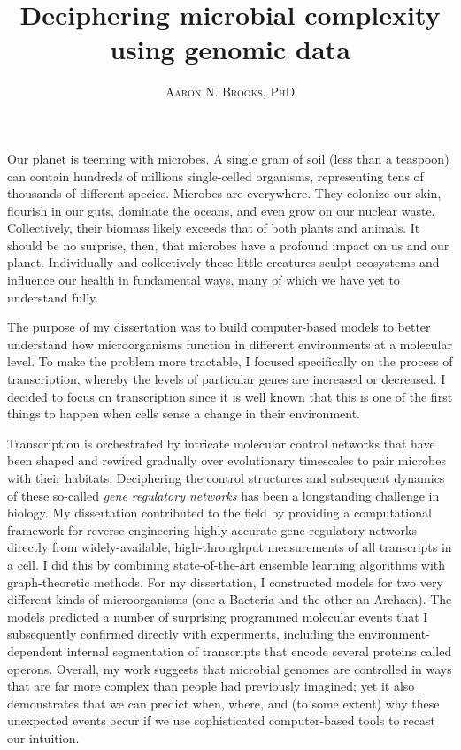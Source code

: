 \documentclass[paper=letter, fontsize=12pt]{article}
\title{\vspace{-15mm}\fontsize{20pt}{10pt}\selectfont\textbf{Deciphering microbial complexity using genomic data}} %
\author{
\large
{\textsc{ Aaron N. Brooks, PhD }}\\[0.1mm]
}
\date{}
\begin{document}
\maketitle %
\thispagestyle{fancy} %

Our planet is teeming with microbes. A single gram of soil (less than a teaspoon) can contain hundreds of millions single-celled organisms, representing tens of thousands of different species. Microbes are everywhere. They colonize our skin, flourish in our guts, dominate the oceans, and even grow on our nuclear waste. Collectively, their biomass likely exceeds that of both plants and animals. It should be no surprise, then, that microbes have a profound impact on us and our planet. Individually and collectively these little creatures sculpt ecosystems and influence our health in fundamental ways, many of which we have yet to understand fully. 

The purpose of my dissertation was to build computer-based models to better understand how microorganisms function in different environments at a molecular level. To make the problem more tractable, I focused specifically on the process of transcription, whereby the levels of particular genes are increased or decreased. I decided to focus on transcription since it is well known that this is one of the first things to happen when cells sense a change in their environment. 

Transcription is orchestrated by intricate molecular control networks that have been shaped and rewired gradually over evolutionary timescales to pair microbes with their habitats. Deciphering the control structures and subsequent dynamics of these so-called \textit{gene regulatory networks} has been a longstanding challenge in biology. My dissertation contributed to the field by providing a computational framework for reverse-engineering highly-accurate gene regulatory networks directly from widely-available, high-throughput measurements of all transcripts in a cell. I did this by combining state-of-the-art ensemble learning algorithms with graph-theoretic methods. For my dissertation, I constructed models for two very different kinds of microorganisms (one a Bacteria and the other an Archaea).  The models predicted a number of surprising programmed molecular events that I subsequently confirmed directly with experiments, including the environment-dependent internal segmentation of transcripts that encode several proteins called operons. Overall, my work suggests that microbial genomes are controlled in ways that are far more complex than people had previously imagined; yet it also demonstrates that we can predict when, where, and (to some extent) why these unexpected events occur if we use sophisticated computer-based tools to recast our intuition. 
\end{document}
